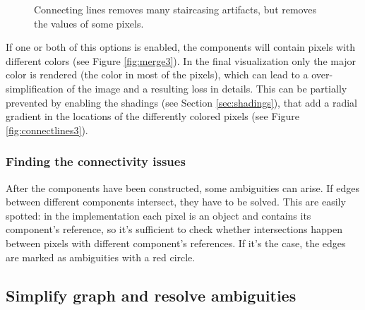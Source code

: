 \documentclass[]{usiinfbachelorproject}
\begin{document}
\begin{itemize}
\begin{figure}[ht]
{			\label{fig:connectlines5}
		}
		\caption{Connecting lines removes many staircasing artifacts, but removes the values of some pixels.}
		\label{fig:connectlines}
	\end{figure}
\end{itemize}
If one or both of this options is enabled, the components will contain pixels with different colors (see Figure \ref{fig:merge3}). In the final visualization only the major color is rendered (the color in most of the pixels), which can lead to a over-simplification of the image and a resulting loss in details. This can be partially prevented by enabling the shadings (see Section \ref{sec:shadings}), that add a radial gradient in the locations of the differently colored pixels (see Figure \ref{fig:connectlines3}).

\subsubsection{Finding the connectivity issues} \label{sec:findambig}

After the components have been constructed, some ambiguities can arise. If edges between different components intersect, they have to be solved. This are easily spotted: in the implementation each pixel is an object and contains its component's reference, so it's sufficient to check whether intersections happen between pixels with different component's references. If it's the case, the edges are marked as ambiguities with a red circle.


\subsection{Simplify graph and resolve ambiguities} \label{sec:ambiguities}
\end{document}
